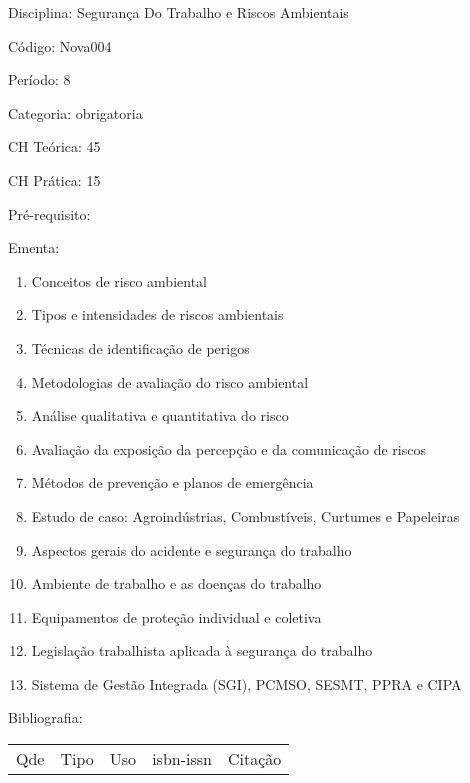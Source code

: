\documentclass[12pt,a4paper,twoside]{report}
\begin{document}
Disciplina: Segurança Do Trabalho e Riscos Ambientais

Código: Nova004

Período: 8

Categoria: obrigatoria

CH Teórica: 45

CH Prática: 15




Pré-requisito:
\begin{enumerate}
\end{enumerate}

Ementa:
\begin{enumerate}
\item Conceitos de risco ambiental
\item Tipos e intensidades de riscos ambientais
\item Técnicas de identificação de perigos
\item Metodologias de avaliação do risco ambiental
\item Análise qualitativa e quantitativa do risco
\item Avaliação da exposição da percepção e da comunicação de riscos
\item Métodos de prevenção e planos de emergência
\item Estudo de caso: Agroindústrias, Combustíveis, Curtumes e Papeleiras
\item Aspectos gerais do acidente e segurança do trabalho
\item Ambiente de trabalho e as doenças do trabalho
\item Equipamentos de proteção individual e coletiva
\item Legislação trabalhista aplicada à segurança do trabalho
\item Sistema de Gestão Integrada (SGI), PCMSO, SESMT, PPRA e CIPA
\end{enumerate}



Bibliografia:


\begin{tabular}{llllp{8cm}}
Qde & Tipo & Uso & isbn-issn & Citação \\
\end{tabular}
\end{document}
